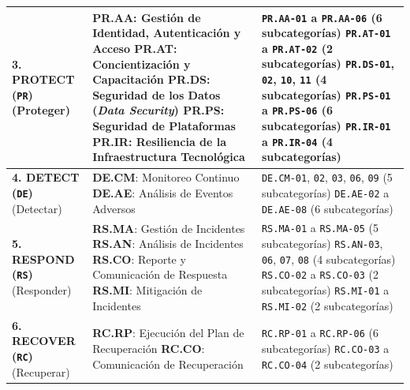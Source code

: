 \documentclass[letterpaper,11pt]{article}
\begin{document}
\begin{table}[H]
\begin{tabular}{|L{3.0cm}|L{7.2cm}|C{5.8cm}|}
\textbf{3. PROTECT (\texttt{PR})}\newline (Proteger) &
\textbf{PR.AA}: Gestión de Identidad, Autenticación y Acceso\newline
\textbf{PR.AT}: Concientización y Capacitación\newline
\textbf{PR.DS}: Seguridad de los Datos (\textit{Data Security})\newline
\textbf{PR.PS}: Seguridad de Plataformas\newline
\textbf{PR.IR}: Resiliencia de la Infraestructura Tecnológica &
\texttt{PR.AA-01} a \texttt{PR.AA-06} (6 subcategorías)\newline
\texttt{PR.AT-01} a \texttt{PR.AT-02} (2 subcategorías)\newline
\texttt{PR.DS-01}, \texttt{02}, \texttt{10}, \texttt{11} (4 subcategorías)\newline
\texttt{PR.PS-01} a \texttt{PR.PS-06} (6 subcategorías)\newline
\texttt{PR.IR-01} a \texttt{PR.IR-04} (4 subcategorías) \\
\hline

\textbf{4. DETECT (\texttt{DE})}\newline (Detectar) &
\textbf{DE.CM}: Monitoreo Continuo\newline
\textbf{DE.AE}: Análisis de Eventos Adversos &
\texttt{DE.CM-01}, \texttt{02}, \texttt{03}, \texttt{06}, \texttt{09} (5 subcategorías)\newline
\texttt{DE.AE-02} a \texttt{DE.AE-08} (6 subcategorías) \\
\hline

\textbf{5. RESPOND (\texttt{RS})}\newline (Responder) &
\textbf{RS.MA}: Gestión de Incidentes\newline
\textbf{RS.AN}: Análisis de Incidentes\newline
\textbf{RS.CO}: Reporte y Comunicación de Respuesta\newline
\textbf{RS.MI}: Mitigación de Incidentes &
\texttt{RS.MA-01} a \texttt{RS.MA-05} (5 subcategorías)\newline
\texttt{RS.AN-03}, \texttt{06}, \texttt{07}, \texttt{08} (4 subcategorías)\newline
\texttt{RS.CO-02} a \texttt{RS.CO-03} (2 subcategorías)\newline
\texttt{RS.MI-01} a \texttt{RS.MI-02} (2 subcategorías) \\
\hline

\textbf{6. RECOVER (\texttt{RC})}\newline (Recuperar) &
\textbf{RC.RP}: Ejecución del Plan de Recuperación\newline
\textbf{RC.CO}: Comunicación de Recuperación &
\texttt{RC.RP-01} a \texttt{RC.RP-06} (6 subcategorías)\newline
\texttt{RC.CO-03} a \texttt{RC.CO-04} (2 subcategorías) \\
\hline
\end{tabular}
\end{table}
\end{document}
